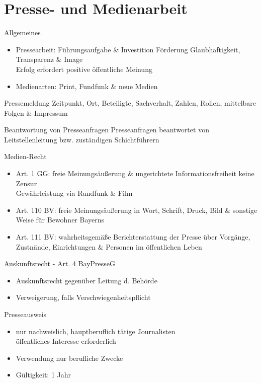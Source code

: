 \section{Presse- und Medienarbeit}
\begin{sectionbox}{Allgemeines}
    \begin{itemize}
        \item Pressearbeit: Führungsaufgabe \& Investition
        \ra Förderung Glaubhaftigkeit, Transparenz \& Image\\
        \ra Erfolg erfordert positive öffentliche Meinung
        \item Medienarten: Print, Fundfunk \& neue Medien
    \end{itemize}
\end{sectionbox}
\begin{hintbox}{Pressemeldung}
    Zeitpunkt, Ort, Beteiligte, Sachverhalt, Zahlen, Rollen, mittelbare Folgen \& Impressum
\end{hintbox}
\begin{warningbox}{Beantwortung von Presseanfragen}
    Presseanfragen beantwortet von Leitstellenleitung bzw. zuständigen Schichtführern
\end{warningbox}
\begin{sectionbox}{Medien-Recht}
    \begin{itemize}
        \item Art. 1 GG: freie Meinungsäußerung \& ungerichtete Informationsfreiheit \ra keine Zensur\\
        \ra Gewährleistung via Rundfunk \& Film\\
        \item Art. 110 BV: freie Meinungsäußerung in Wort, Schrift, Druck, Bild \& sonstige Weise für Bewohner Bayerns
        \item Art. 111 BV: wahrheitsgemäße Berichterstattung der Presse über Vorgänge, Zustnände, Einrichtungen \& Personen im öffentlichen Leben
    \end{itemize}
\end{sectionbox}
\begin{sectionbox}{Auskunftsrecht - Art. 4 BayPresseG}
    \begin{itemize}
        \item Auskunftsrecht gegenüber Leitung d. Behörde
        \item Verweigerung, falls Verschwiegenheitspflicht
    \end{itemize}
\end{sectionbox}
\begin{sectionbox}{Presseausweis}
    \begin{itemize}
        \item nur nachweislich, hauptberuflich tätige Journalisten\\
        \ra öffentliches Interesse erforderlich
        \item Verwendung nur berufliche Zwecke
        \item Gültigkeit: 1 Jahr
    \end{itemize}
\end{sectionbox}